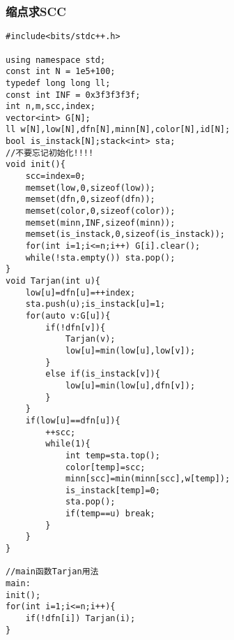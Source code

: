 \documentclass[twocolumn,a4]{article}
\begin{document}
\subsubsection{缩点求SCC}
\begin{lstlisting}
#include<bits/stdc++.h>

using namespace std;
const int N = 1e5+100;
typedef long long ll;
const int INF = 0x3f3f3f3f;
int n,m,scc,index;
vector<int> G[N];
ll w[N],low[N],dfn[N],minn[N],color[N],id[N];
bool is_instack[N];stack<int> sta;
//不要忘记初始化!!!!
void init(){
	scc=index=0;
	memset(low,0,sizeof(low));
	memset(dfn,0,sizeof(dfn));
	memset(color,0,sizeof(color));
	memset(minn,INF,sizeof(minn));
	memset(is_instack,0,sizeof(is_instack));
	for(int i=1;i<=n;i++) G[i].clear();
	while(!sta.empty()) sta.pop();
}
void Tarjan(int u){
	low[u]=dfn[u]=++index;
	sta.push(u);is_instack[u]=1;
	for(auto v:G[u]){
		if(!dfn[v]){
			Tarjan(v);
			low[u]=min(low[u],low[v]);
		}
		else if(is_instack[v]){
			low[u]=min(low[u],dfn[v]);
		}
	}
	if(low[u]==dfn[u]){
		++scc;
		while(1){
			int temp=sta.top();
			color[temp]=scc;
			minn[scc]=min(minn[scc],w[temp]);
			is_instack[temp]=0;
			sta.pop();
			if(temp==u) break;
		}
	}
}

//main函数Tarjan用法
main:
init();
for(int i=1;i<=n;i++){
	if(!dfn[i]) Tarjan(i);
}
\end{lstlisting}
\end{document}

